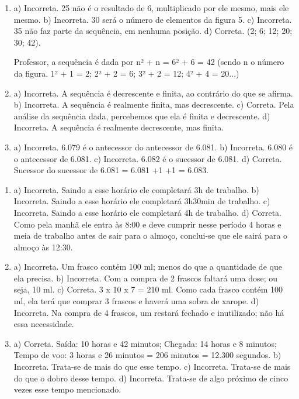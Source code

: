 
\begin{enumerate}
\item
a) Incorreta. 25 não é o resultado de 6, multiplicado por ele mesmo, mais ele mesmo.
b) Incorreta. 30 será o número de elementos da figura 5.
c) Incorreta. 35 não faz parte da sequência, em nenhuma posição.
d) Correta. (2; 6; 12; 20; 30; 42).

Professor, a sequência é dada por n² + n =
6² + 6 = 42 (sendo n o número da figura. 1² + 1 = 2; 2² + 2 = 6; 3² + 2 = 12; 4² + 4 = 20...)

\item
a) Incorreta. A sequência é decrescente e finita, ao contrário do que se afirma.
b) Incorreta. A sequência é realmente finita, mas decrescente.
c) Correta. Pela análise da sequência dada, percebemos que ela é finita e
decrescente.
d) Incorreta. A sequência é realmente decrescente, mas finita.

\item
a) Incorreta. 6.079 é o antecessor do antecessor de 6.081.
b) Incorreta. 6.080 é o antecessor de 6.081.
c) Incorreta. 6.082 é o sucessor de 6.081.
d) Correta. Sucessor do sucessor de 6.081 = 6.081 +1 +1 = 6.083.
\end{enumerate}



\begin{enumerate}
\item
a) Incorreta. Saindo a esse horário ele completará 3h de trabalho.
b) Incorreta. Saindo a esse horário ele completará 3h30min de trabalho.
c) Incorreta. Saindo a esse horário ele completará 4h de trabalho.
d) Correta. Como pela manhã ele entra às 8:00 e deve cumprir nesse período 4 horas e
meia de trabalho antes de sair para o almoço, conclui-se que ele sairá
para o almoço às 12:30.

\item
a) Incorreta. Um frasco contém 100 ml; menos do que a quantidade de que ela precisa.
b) Incorreta. Com a compra de 2 frascos faltará uma dose; ou seja, 10 ml.
c) Correta. 
3 x 10 x 7 = 210 ml. Como cada frasco contém 100 ml, ela terá que
comprar 3 frascos e haverá uma sobra de xarope.
d) Incorreta. Na compra de 4 frascos, um restará fechado e inutilizado; não há essa necessidade.

\item
a) Correta. 
Saída: 10 horas e 42 minutos;
Chegada: 14 horas e 8 minutos;
Tempo de voo: 3 horas e 26 minutos = 206 minutos = 12.300 segundos.
b) Incorreta. Trata-se de mais do que esse tempo.
c) Incorreta. Trata-se de mais do que o dobro desse tempo.
d) Incorreta. Trata-se de algo próximo de cinco vezes esse tempo mencionado.
\end{enumerate}

